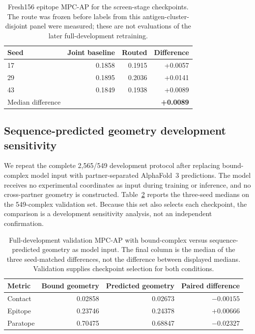 \documentclass[10pt]{article}
\newcommand{\mpcap}{MPC-AP}
\begin{document}
\begin{table}[H]
\centering
\caption{Fresh156 epitope \mpcap{} for the screen-stage checkpoints. The route
was frozen before labels from this antigen-cluster-disjoint panel were measured;
these are not evaluations of the later full-development retraining.}
\label{tab:fresh}
\small
\begin{tabular}{lrrr}
\toprule
Seed & Joint baseline & Routed & Difference \\
\midrule
17 & 0.1858 & 0.1915 & +0.0057 \\
29 & 0.1895 & 0.2036 & +0.0141 \\
43 & 0.1849 & 0.1938 & +0.0089 \\
\midrule
Median difference & & & \textbf{+0.0089} \\
\bottomrule
\end{tabular}
\end{table}

\subsection{Sequence-predicted geometry development sensitivity}

We repeat the complete 2,565/549 development protocol after replacing
bound-complex model input with partner-separated AlphaFold~3 predictions. The
model receives no experimental coordinates as input during training or
inference, and no cross-partner geometry is constructed. Table~\ref{tab:full} reports the
three-seed medians on the 549-complex validation set. Because this set also
selects each checkpoint, the comparison is a development sensitivity analysis,
not an independent confirmation.

\begin{table}[H]
\centering
\caption{Full-development validation \mpcap{} with bound-complex versus
sequence-predicted geometry as model input. The final column is the median of
the three seed-matched differences, not the difference between displayed
medians. Validation supplies checkpoint selection for both conditions.}
\label{tab:full}
\small
\begin{tabular}{lrrr}
\toprule
Metric & Bound geometry & Predicted geometry & Paired difference \\
\midrule
Contact & 0.02858 & 0.02673 & $-0.00155$ \\
Epitope & 0.23746 & 0.24378 & $+0.00666$ \\
Paratope & 0.70475 & 0.68847 & $-0.02327$ \\
\bottomrule
\end{tabular}
\end{table}
\end{document}
